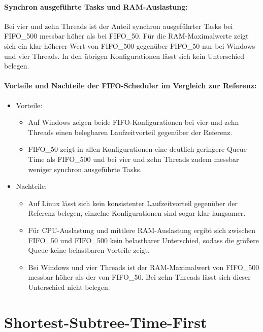 \begin{sloppypar}
\paragraph{Synchron ausgeführte Tasks und \acs{RAM}-Auslastung:}
Bei vier und zehn Threads ist der Anteil synchron ausgeführter Tasks bei \acs{FIFO}\_500 messbar höher als bei \acs{FIFO}\_50. 
Für die \acs{RAM}-Maximalwerte zeigt sich ein klar höherer Wert von \acs{FIFO}\_500 gegenüber \acs{FIFO}\_50 nur bei Windows und vier Threads. In den übrigen Konfigurationen lässt sich kein Unterschied belegen.

\paragraph{Vorteile und Nachteile der \acs{FIFO}-Scheduler im Vergleich zur Referenz:}
\begin{itemize}
    \item Vorteile:
    \begin{itemize}
        \item Auf Windows zeigen beide \acs{FIFO}-Konfigurationen bei vier und zehn Threads einen belegbaren Laufzeitvorteil gegenüber der Referenz.
        \item \acs{FIFO}\_50 zeigt in allen Konfigurationen eine deutlich geringere Queue Time als \acs{FIFO}\_500 und bei vier und zehn Threads zudem messbar weniger synchron ausgeführte Tasks.
    \end{itemize}
    \item Nachteile:
    \begin{itemize}
        \item Auf Linux lässt sich kein konsistenter Laufzeitvorteil gegenüber der Referenz belegen, einzelne Konfigurationen sind sogar klar langsamer.
        \item Für \acs{CPU}-Auslastung und mittlere \acs{RAM}-Auslastung ergibt sich zwischen \acs{FIFO}\_50 und \acs{FIFO}\_500 kein belastbarer Unterschied, sodass die größere Queue keine belastbaren Vorteile zeigt.
        \item Bei Windows und vier Threads ist der \acs{RAM}-Maximalwert von \acs{FIFO}\_500 messbar höher als der von \acs{FIFO}\_50. Bei zehn Threads lässt sich dieser Unterschied nicht belegen.
    \end{itemize}
\end{itemize}

\section{Shortest-Subtree-Time-First}


\end{sloppypar}

